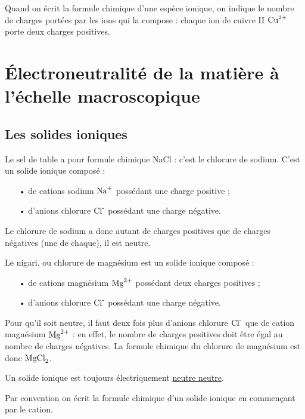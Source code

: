 \documentclass[12pt,a4paper]{article}
\begin{document}
Quand on écrit la formule chimique d'une espèce ionique, on indique le nombre de charges portées par les ions qui la compose : chaque ion de cuivre II $\text{Cu}^\text{2+}$ porte deux charges positives.

\section{Électroneutralité de la matière à l'échelle macroscopique}

\subsection{Les solides ioniques}

\begin{exemple}
Le sel de table a pour formule chimique NaCl : c'est le chlorure de sodium.
C'est un solide ionique composé :
\begin{itemize}
\item[•] de cations sodium $\text{Na}^\text{+}$ possédant une charge positive ;
\item[•] d'anions chlorure $\text{Cl}^\text{-}$ possédant une charge négative.
\end{itemize}
Le chlorure de sodium a donc autant de charges positives que de charges négatives (une de chaque), il est neutre.
\end{exemple}

\begin{exemple}
Le nigari, ou chlorure de magnésium est un solide ionique composé :
\begin{itemize}
\item[•] de cations magnésium $\text{Mg}^\text{2+}$ possédant deux charges positives ;
\item[•] d'anions chlorure $\text{Cl}^\text{-}$ possédant une charge négative.
\end{itemize}
Pour qu'il soit neutre, il faut deux fois plus d'anions chlorure $\text{Cl}^\text{-}$ que de cation magnésium $\text{Mg}^\text{2+}$ : en effet, le nombre de charges positives doit être égal au nombre de charges négatives.
La formule chimique du chlorure de magnésium est donc $\text{MgCl}_\text{2}$.
\end{exemple}

\begin{definition}
Un solide ionique est toujours électriquement \underline{\color{red_c} neutre neutre}.
\end{definition}

Par convention on écrit la formule chimique d'un solide ionique en commençant par le cation.
\end{document}
